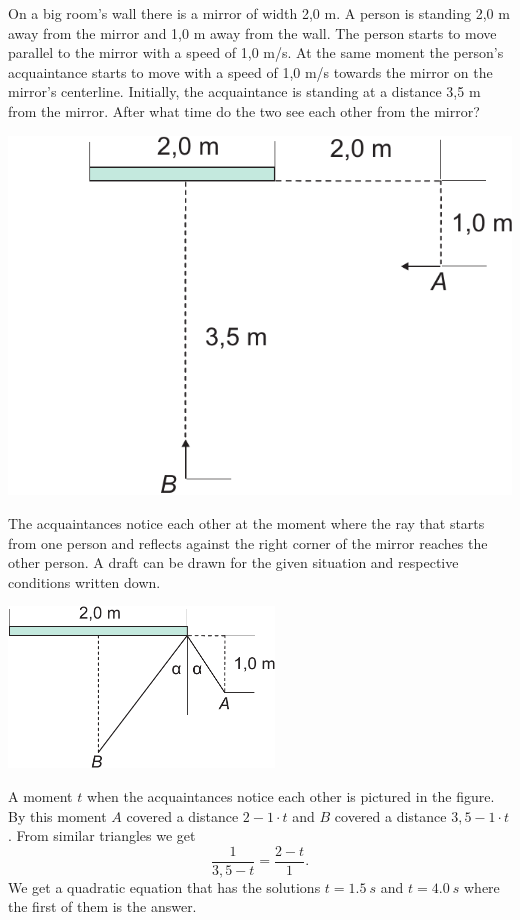 {\ifEngStatement
On a big room’s wall there is a mirror of width 2,0 m. A person is standing 2,0 m away from the mirror and 1,0 m away from the wall. The person starts to move parallel to the mirror with a speed of 1,0 m/s. At the same moment the person’s acquaintance starts to move with a speed of 1,0 m/s towards the mirror on the mirror’s centerline. Initially, the acquaintance is standing at a distance 3,5 m from the mirror. After what time do the two see each other from the mirror?
\begin{center}
\includegraphics[width=0.5\linewidth]{2012-v2g-01-peegel2}%
\end{center}
\fi


\ifEngHint
The acquaintances notice each other at the moment where the ray that starts from one person and reflects against the right corner of the mirror reaches the other person. A draft can be drawn for the given situation and respective conditions written down.
\fi


\ifEngSolution
\begin{center}
\includegraphics[width=200pt]{2012-v2g-01-peegel_lah}
\end{center}
A moment $t$ when the acquaintances notice each other is pictured in the figure. By this moment $A$ covered a distance $2-1\cdot t$ and $B$ covered a distance $3,5-1\cdot t$. From similar triangles we get
\[
\frac{1}{3,5-t}=\frac{2-t}{1}.
\] 
We get a quadratic equation that has the solutions $t=\SI{1,5}{s}$ and $t=\SI{4,0}{s}$ where the first of them is the answer.
\fi
}